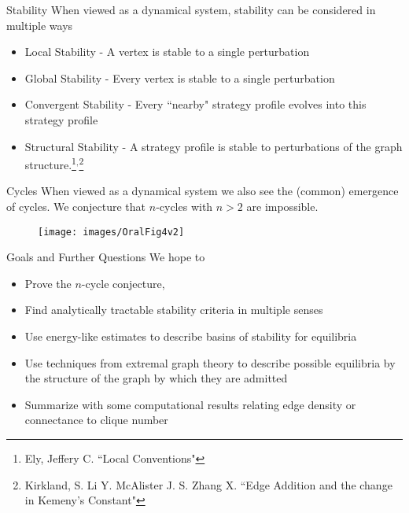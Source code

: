 \documentclass{beamer}
\begin{document}
\begin{frame}{Stability}
	When viewed as a dynamical system, stability can be considered in multiple ways 
	\begin{itemize}
		\item Local Stability - A vertex is stable to a single perturbation
		\item Global Stability - Every vertex is stable to a single perturbation
		\item Convergent Stability - Every ``nearby" strategy profile evolves into this strategy profile
		\item Structural Stability - A strategy profile is stable to perturbations of the graph structure.\footnote{Ely, Jeffery C. ``Local Conventions"}$^,$\footnote{Kirkland, S. Li Y. McAlister J. S. Zhang X. ``Edge Addition and the change in Kemeny's Constant"}
	\end{itemize}
\end{frame}

\begin{frame}{Cycles}
	When viewed as a dynamical system we also see the (common) emergence of cycles. We conjecture that $n$-cycles with $n>2$ are impossible. 
	\begin{figure}
	\texttt{[image: images/OralFig4v2]}
	\end{figure} 
\end{frame}

\begin{frame}{Goals and Further Questions}
	We hope to 
	\begin{itemize}
		\item Prove the $n$-cycle conjecture,
		\item Find analytically tractable stability criteria in multiple senses
		\item Use energy-like estimates to describe basins of stability for equilibria
		\item Use techniques from extremal graph theory to describe possible equilibria by the structure of the graph by which they are admitted
		\item Summarize with some computational results relating edge density or connectance to clique number 
	\end{itemize}
\end{frame}
\end{document}
